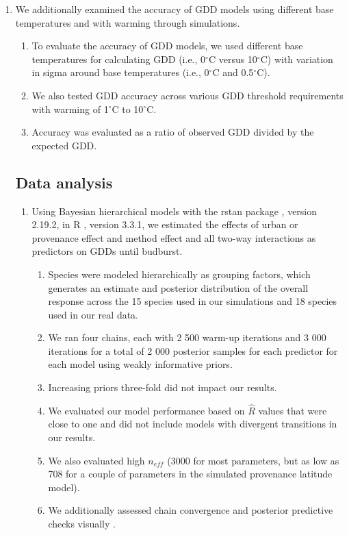 \documentclass{article}\usepackage[]{graphicx}\usepackage[]{color}
\begin{document}
\begin{enumerate}
\item We additionally examined the accuracy of GDD models using different base temperatures and with warming through simulations.
\begin{enumerate}
  \item To evaluate the accuracy of GDD models, we used different base temperatures for calculating GDD (i.e., 0$^{\circ}$C versus 10$^{\circ}$C) with variation in sigma around base temperatures (i.e., 0$^{\circ}$C and 0.5$^{\circ}$C).
  \item We also tested GDD accuracy across various GDD threshold requirements with warming of 1$^{\circ}$C to 10$^{\circ}$C. 
  \item Accuracy was evaluated as a ratio of observed GDD divided by the expected GDD.
\end{enumerate}

\subsection*{Data analysis}
\begin{enumerate}
\item Using Bayesian hierarchical models with the rstan package \citep{rstan2019}, version 2.19.2,  in R \citep{R}, version 3.3.1, we estimated the effects of urban or provenance effect and method effect and all two-way interactions as predictors on GDDs until budburst. 
  \begin{enumerate} 
  \item Species were modeled hierarchically as grouping factors, which generates an estimate and posterior distribution of the overall response across the 15 species used in our simulations and 18 species used in our real data.
  \item We ran four chains, each with 2 500 warm-up iterations and 3 000 iterations for a total of 2 000 posterior samples for each predictor for each model using weakly informative priors.
  \item Increasing priors three-fold did not impact our results.
  \item We evaluated our model performance based on $\hat{R}$ values that were close to one and did not include models with divergent transitions in our results. 
  \item We also evaluated high $n_{eff}$ (3000 for most parameters, but as low as 708 for a couple of parameters in the simulated provenance latitude model). 
  \item We additionally assessed chain convergence and posterior predictive checks visually \citep{BDA}.
  \end{enumerate}
\end{enumerate}


\end{enumerate}
\end{document}
